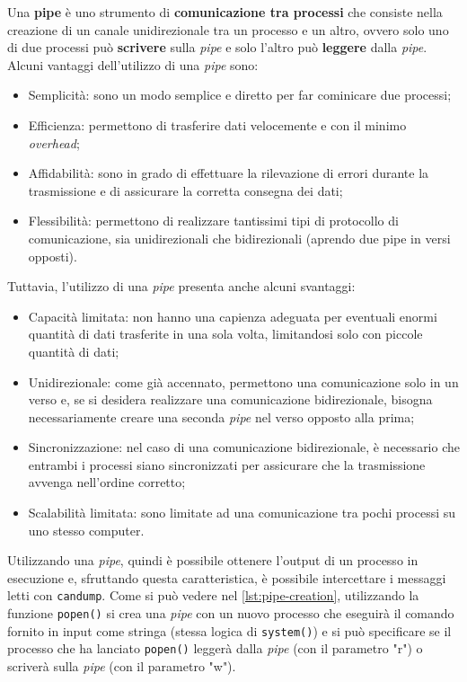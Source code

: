 Una \textbf{pipe} è uno strumento di \textbf{comunicazione tra processi} che consiste nella creazione di un canale unidirezionale tra un processo e un altro, ovvero solo uno di due processi può \textbf{scrivere} sulla \emph{pipe} e solo l'altro può \textbf{leggere} dalla \emph{pipe}. Alcuni vantaggi dell'utilizzo di una \emph{pipe} sono:
\begin{itemize}
    \item Semplicità: sono un modo semplice e diretto per far cominicare due processi;
    \item Efficienza: permettono di trasferire dati velocemente e con il minimo \emph{overhead};
    \item Affidabilità: sono in grado di effettuare la rilevazione di errori durante la trasmissione e di assicurare la corretta consegna dei dati;
    \item Flessibilità: permettono di realizzare tantissimi tipi di protocollo di comunicazione, sia unidirezionali che bidirezionali (aprendo due pipe in versi opposti). \cite{geeksforgeeks_pipe}
\end{itemize}

Tuttavia, l'utilizzo di una \emph{pipe} presenta anche alcuni svantaggi:
\begin{itemize}
    \item Capacità limitata: non hanno una capienza adeguata per eventuali enormi quantità di dati trasferite in una sola volta, limitandosi solo con piccole quantità di dati;
    \item Unidirezionale: come già accennato, permettono una comunicazione solo in un verso e, se si desidera realizzare una comunicazione bidirezionale, bisogna necessariamente creare una seconda \emph{pipe} nel verso opposto alla prima;
    \item Sincronizzazione: nel caso di una comunicazione bidirezionale, è necessario che entrambi i processi siano sincronizzati per assicurare che la trasmissione avvenga nell'ordine corretto; 
    \item Scalabilità limitata: sono limitate ad una comunicazione tra pochi processi su uno stesso computer. \cite{geeksforgeeks_pipe}
\end{itemize}

Utilizzando una \emph{pipe}, quindi è possibile ottenere l'output di un processo in esecuzione e, sfruttando questa caratteristica, è possibile intercettare i messaggi letti con \texttt{candump}. Come si può vedere nel \autoref{lst:pipe-creation}, utilizzando la funzione \texttt{popen()} si crea una \emph{pipe} con un nuovo processo che eseguirà il comando fornito in input come stringa (stessa logica di \texttt{system()}) e si può specificare se il processo che ha lanciato \texttt{popen()} leggerà dalla \emph{pipe} (con il parametro "r") o scriverà sulla \emph{pipe} (con il parametro "w").

